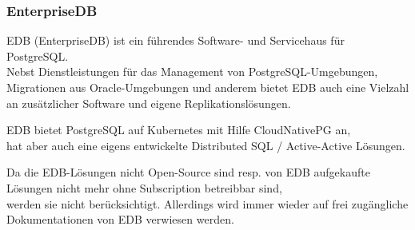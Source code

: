 
\begin{flushleft}
    \subsubsection{EnterpriseDB}
    EDB (EnterpriseDB) ist ein führendes Software- und Servicehaus für PostgreSQL\cite{UIY9LXTF}.\\
    Nebst Dienstleistungen für das Management von PostgreSQL-Umgebungen, Migrationen aus Oracle-Umgebungen und anderem
    bietet EDB auch eine Vielzahl an zusätzlicher Software und eigene Replikationslösungen.\\
\end{flushleft}
\begin{flushleft}
    EDB bietet PostgreSQL auf Kubernetes mit Hilfe CloudNativePG an,\\
    hat aber auch eine eigens entwickelte Distributed SQL / Active-Active Lösungen.
\end{flushleft}
\begin{flushleft}
    Da die EDB-Lösungen nicht Open-Source sind resp. von EDB aufgekaufte Lösungen nicht mehr ohne Subscription betreibbar sind,\\
    werden sie nicht berücksichtigt.
    Allerdings wird immer wieder auf frei zugängliche Dokumentationen von EDB verwiesen werden.
\end{flushleft}